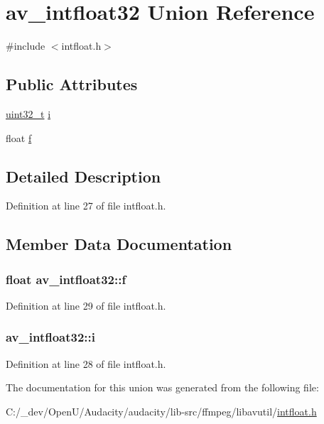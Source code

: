 \hypertarget{unionav__intfloat32}{}\section{av\+\_\+intfloat32 Union Reference}
\label{unionav__intfloat32}


{\ttfamily \#include $<$intfloat.\+h$>$}

\subsection*{Public Attributes}
\begin{DoxyCompactItemize}
\item 
\hyperlink{lib-src_2ffmpeg_2win32_2stdint_8h_a6eb1e68cc391dd753bc8ce896dbb8315}{uint32\+\_\+t} \hyperlink{unionav__intfloat32_af159360aa1af6aa0a8fe034e0a0e3ef3}{i}
\item 
float \hyperlink{unionav__intfloat32_ab73a5849af5822a9ca6b0cf37af75cc8}{f}
\end{DoxyCompactItemize}


\subsection{Detailed Description}


Definition at line 27 of file intfloat.\+h.



\subsection{Member Data Documentation}
\subsubsection[{\texorpdfstring{f}{f}}]{\setlength{\rightskip}{0pt plus 5cm}float av\+\_\+intfloat32\+::f}\hypertarget{unionav__intfloat32_ab73a5849af5822a9ca6b0cf37af75cc8}{}\label{unionav__intfloat32_ab73a5849af5822a9ca6b0cf37af75cc8}


Definition at line 29 of file intfloat.\+h.

\subsubsection[{\texorpdfstring{i}{i}}]{ av\+\_\+intfloat32\+::i}\hypertarget{unionav__intfloat32_af159360aa1af6aa0a8fe034e0a0e3ef3}{}\label{unionav__intfloat32_af159360aa1af6aa0a8fe034e0a0e3ef3}


Definition at line 28 of file intfloat.\+h.



The documentation for this union was generated from the following file\+:\begin{DoxyCompactItemize}
\item 
C\+:/\+\_\+dev/\+Open\+U/\+Audacity/audacity/lib-\/src/ffmpeg/libavutil/\hyperlink{intfloat_8h}{intfloat.\+h}\end{DoxyCompactItemize}
